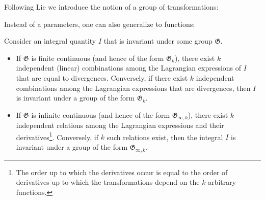     Following Lie we introduce the notion of a group of transformations:

    Instead of a parameters, one can also generalize to functions:

    \begin{theorem}[Noether]
        Consider an integral quantity $I$ that is invariant under some group $\mathfrak{G}$.
        \begin{itemize}
            \item If $\mathfrak{G}$ is finite continuous (and hence of the form $\mathfrak{G}_k$), there exist $k$ independent (linear) combinations among the Lagrangian expressions of $I$ that are equal to divergences. Conversely, if there exist $k$ independent combinations among the Lagrangian expressions that are divergences, then $I$ is invariant under a group of the form $\mathfrak{G}_k$.
            \item If $\mathfrak{G}$ is infinite continuous (and hence of the form $\mathfrak{G}_{\infty,k}$), there exist $k$ independent relations among the Lagrangian expressions and their derivatives\footnote{The order up to which the derivatives occur is equal to the order of derivatives up to which the transformations depend on the $k$ arbitrary functions.}. Conversely, if $k$ such relations exist, then the integral $I$ is invariant under a group of the form $\mathfrak{G}_{\infty,k}$.
        \end{itemize}
    \end{theorem}

